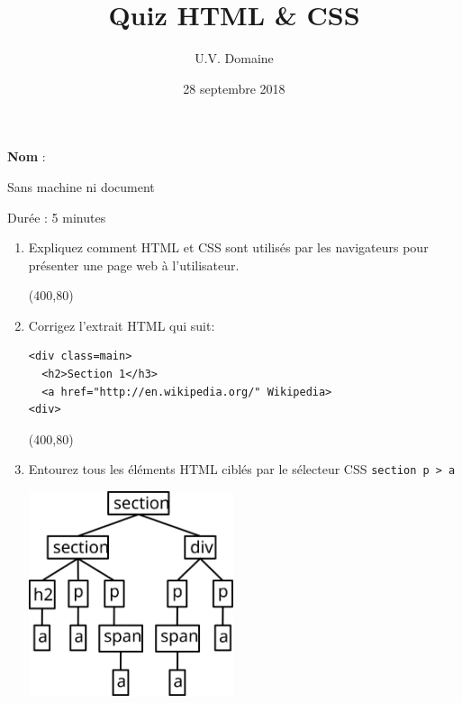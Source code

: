 \documentclass[a4paper, 12pt]{article}
\title{Quiz HTML \& CSS}
\author{U.V. Domaine}
\date{28 septembre 2018}
\begin{document}
\maketitle

\textbf{Nom} :

Sans machine ni document

Durée : 5 minutes

\vspace{1cm}

\begin{enumerate}
\item Expliquez comment HTML et CSS sont utilisés par les navigateurs pour
  présenter une page web à l'utilisateur.

  \framebox(400,80){}

\item Corrigez l'extrait HTML qui suit:
\begin{lstlisting}
<div class=main>
  <h2>Section 1</h3>
  <a href="http://en.wikipedia.org/" Wikipedia>
<div>
\end{lstlisting}

\framebox(400,80){}

\item Entourez tous les éléments HTML ciblés par le sélecteur CSS
  \lstinline{section p > a}

  \vspace{.2in}
  \includegraphics[width=6cm,keepaspectratio]{quiz1-tree}

\end{enumerate}
\end{document}
